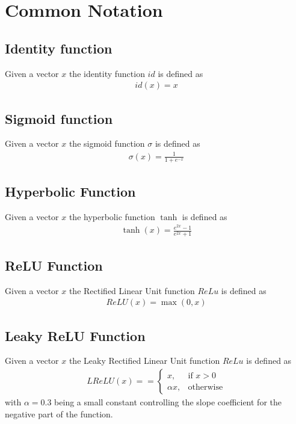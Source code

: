 \chapter{Common Notation}

\section{Identity function}
Given a vector $x$ the identity function $id$ is defined as 
\begin{gather}
    \label{identity}
    id(x) = x
\end{gather}

\section{Sigmoid function}
Given a vector $x$ the sigmoid function $\sigma$ is defined as 
\begin{gather}
    \label{sigmoid}
    \sigma(x) = \frac {1} {1 + e^{-x}}
\end{gather}

\section{Hyperbolic Function}
Given a vector $x$ the hyperbolic function $\tanh$ is defined as 
\begin{gather}
    \label{tanh}
    \tanh(x) = \frac {e^{2x} -1} {e^{2x} +1}
\end{gather}

\section{ReLU Function}
Given a vector $x$ the Rectified Linear Unit function $ReLu$ is defined as 
\begin{gather}
    \label{relu}
    ReLU(x) = \max(0, x)
\end{gather}

\section{Leaky ReLU Function}
Given a vector $x$ the Leaky Rectified Linear Unit function $ReLu$ is defined as 
\begin{gather}
    \label{lelu}
    LReLU(x) =  = 
    \begin{cases}
        x,& \text{if } x > 0 \\
        \alpha x,              & \text{otherwise}
    \end{cases}
\end{gather}
with $\alpha=0.3$ being a small constant controlling the slope coefficient for the negative part of the function.

